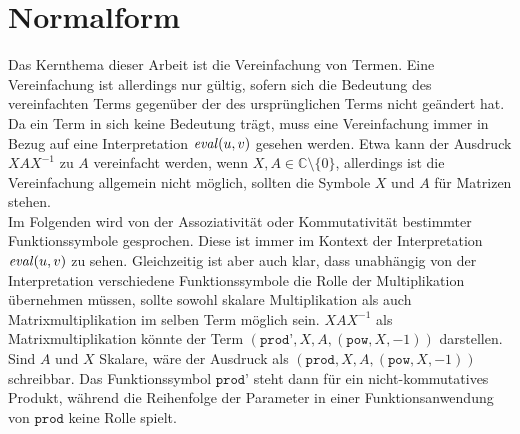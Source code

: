 



\chapter {Normalform} \label{secErsteNormalform}

Das Kernthema dieser Arbeit ist die Vereinfachung von Termen. Eine Vereinfachung ist allerdings nur gültig, sofern sich die Bedeutung des vereinfachten Terms gegenüber der des ursprünglichen Terms nicht geändert hat. Da ein Term in sich keine Bedeutung trägt, muss eine Vereinfachung immer in Bezug auf eine Interpretation $\mathit{eval}(u, v)$ gesehen werden. Etwa kann der Ausdruck $X A X^{-1}$ zu $A$ vereinfacht werden, wenn $X, A \in \mathbb{C} \setminus \{0\}$, allerdings ist die Vereinfachung allgemein nicht möglich, sollten die Symbole $X$ und $A$ für Matrizen stehen. \\
Im Folgenden wird von der Assoziativität oder Kommutativität bestimmter Funktionssymbole gesprochen. Diese ist immer im Kontext der Interpretation $\mathit{eval}(u, v)$ zu sehen. Gleichzeitig ist aber auch klar, dass unabhängig von der Interpretation verschiedene Funktionssymbole die Rolle der Multiplikation übernehmen müssen, sollte sowohl skalare Multiplikation als auch Matrixmultiplikation im selben Term möglich sein. $X A X^{-1}$ als Matrixmultiplikation könnte der Term $(\texttt{prod'}, X, A, (\texttt{pow}, X, -1))$ darstellen. Sind $A$ und $X$ Skalare, wäre der Ausdruck als $(\texttt{prod}, X, A, (\texttt{pow}, X, -1))$ schreibbar. Das Funktionssymbol $\texttt{prod'}$ steht dann für ein nicht-kommutatives Produkt, während die Reihenfolge der Parameter in einer Funktionsanwendung von $\texttt{prod}$ keine Rolle spielt.\\

